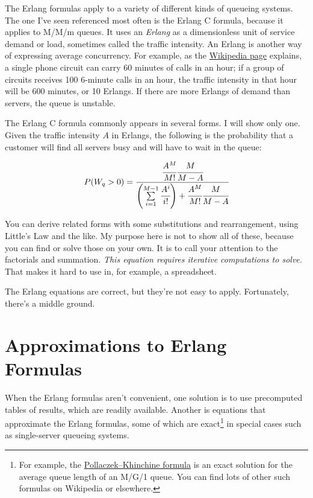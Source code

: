 \documentclass{vivid_layout_pdf}
\begin{document}
The Erlang formulas apply to a variety of different kinds of queueing systems. The one I've seen referenced most often is the Erlang C formula, because it applies to M/M/m queues. It uses an {\itshape Erlang} as a dimensionless unit of service demand or load, sometimes called the traffic intensity. An Erlang is another way of expressing average concurrency. For example, as the \href{http://en.wikipedia.org}{Wikipedia page} explains, a single phone circuit can carry 60 minutes of calls in an hour; if a group of circuits receives 100 6-minute calls in an hour, the traffic intensity in that hour will be 600 minutes, or 10 Erlangs. If there are more Erlangs of demand than servers, the queue is unstable.

The Erlang C formula commonly appears in several forms. I will show only one. Given the traffic intensity $A$ in Erlangs, the following is the probability that a customer will find all servers busy and will have to wait in the queue:

\[
P(W_q > 0) = \cfrac{\cfrac{A^M}{M!}\cfrac{M}{M-A}}{\left( \sum\limits_{i=1}^{M-1} \cfrac{A^i}{i!} \right) + \cfrac{A^M}{M!}\cfrac{M}{M-A}}
\]	%

You can derive related forms with some substitutions and rearrangement, using Little's Law and the like. My purpose here is not to show all of these, because you can find or solve those on your own. It is to call your attention to the factorials and summation. {\itshape This equation requires iterative computations to solve.} That makes it hard to use in, for example, a spreadsheet.

The Erlang equations are correct, but they're not easy to apply.
Fortunately, there's a middle ground.

\section{Approximations to Erlang Formulas}

When the Erlang formulas aren't convenient, one solution is to use precomputed tables of results, which are readily available. Another is equations that approximate the Erlang formulas, some of which are exact\footnote{For example, the \href{https://en.wikipedia.org/wiki/Pollaczek\%E2\%80\%93Khinchine_formula}{Pollaczek–Khinchine formula} is an exact solution for the average queue length of an M/G/1 queue. You can find lots of other such formulas on Wikipedia or elsewhere.} in special cases such as single-server queueing systems.
\end{document}
